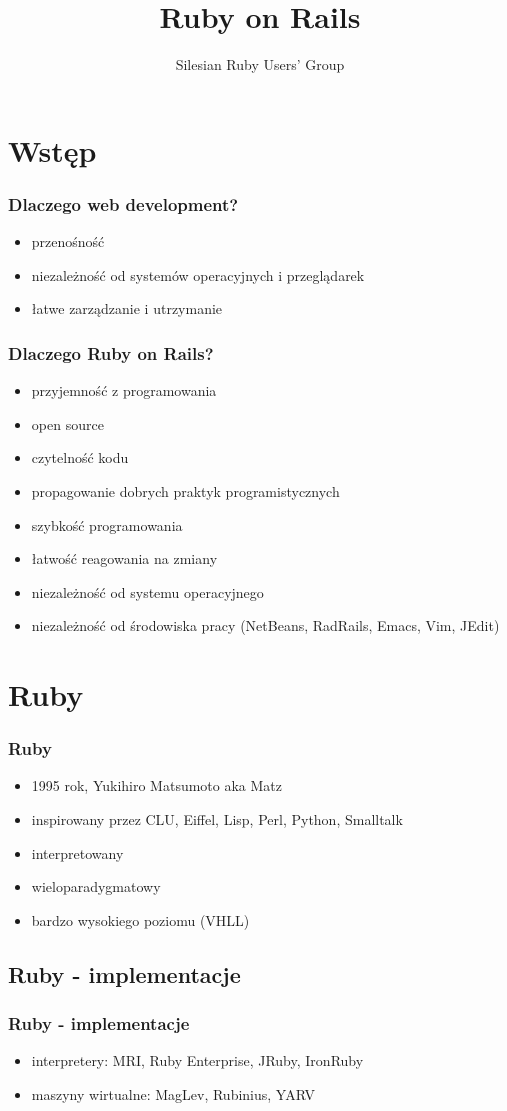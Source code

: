 \documentclass[12t]{beamer}
\author{Silesian Ruby Users' Group}
\title{Ruby on Rails}
\begin{document}
\frame{\titlepage}

\section{Wstęp}
\begin{frame}
  \frametitle{Dlaczego web development?}
  \begin{itemize}
  \item przenośność
  \item niezależność od systemów operacyjnych i przeglądarek
  \item łatwe zarządzanie i utrzymanie
  \end{itemize}
\end{frame}

\begin{frame}
  \frametitle{Dlaczego Ruby on Rails?}
  \begin{itemize}
  \item przyjemność z programowania
  \item open source
  \item czytelność kodu
  \item propagowanie dobrych praktyk programistycznych
  \item szybkość programowania
  \item łatwość reagowania na zmiany
  \item niezależność od systemu operacyjnego
  \item niezależność od środowiska pracy (NetBeans, RadRails, Emacs,
    Vim, JEdit)
  \end{itemize}
\end{frame}

\section{Ruby}
\begin{frame}
  \frametitle{Ruby}
  \begin{itemize}
  \item 1995 rok, Yukihiro Matsumoto aka Matz
  \item inspirowany przez CLU, Eiffel, Lisp, Perl, Python, Smalltalk
  \item interpretowany
  \item wieloparadygmatowy
  \item bardzo wysokiego poziomu (VHLL)
  \end{itemize}
\end{frame}

\subsection{Ruby - implementacje}
\begin{frame}
  \frametitle{Ruby - implementacje}
  \begin{itemize}
  \item interpretery: MRI, Ruby Enterprise, JRuby, IronRuby
  \item maszyny wirtualne: MagLev, Rubinius, YARV
  \end{itemize}
\end{frame}
\end{document}
